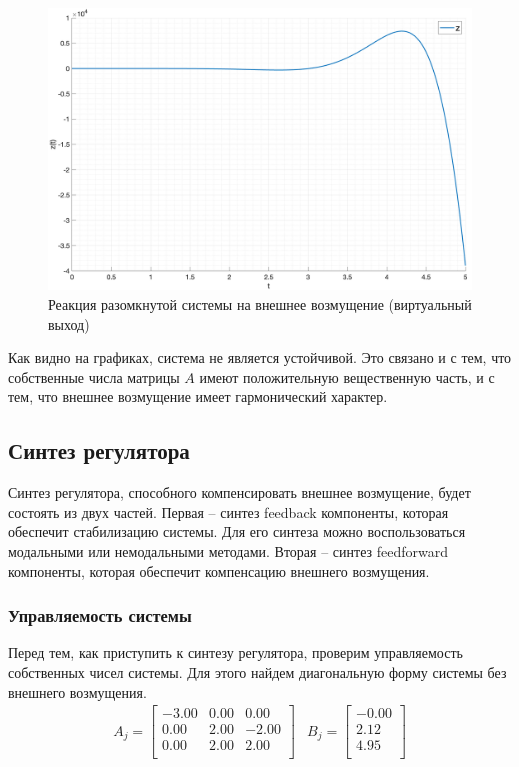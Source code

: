 \begin{figure}[ht!]
    \centering
    \includegraphics[width=\textwidth]{media/plots/open_z.png}
    \caption{Реакция разомкнутой системы на внешнее возмущение (виртуальный выход)}
    \label{fig:open_z}
\end{figure}
Как видно на графиках, система не является устойчивой. Это связано и с тем, что
собственные числа матрицы $A$ имеют положительную вещественную часть, и с тем, что
внешнее возмущение имеет гармонический характер.

\FloatBarrier
\subsection{Синтез регулятора}
Синтез регулятора, способного компенсировать внешнее возмущение, будет состоять из двух частей. 
Первая -- синтез feedback компоненты, которая обеспечит стабилизацию системы. Для его синтеза
можно воспользоваться модальными или немодальными методами. Вторая -- синтез feedforward компоненты,
которая обеспечит компенсацию внешнего возмущения.

\subsubsection{Управляемость системы}
Перед тем, как приступить к синтезу регулятора, проверим управляемость собственных 
чисел системы. Для этого найдем диагональную форму системы без внешнего возмущения.
\begin{eqnarray}
    A_j = \begin{bmatrix}
        -3.00  & 0.00  & 0.00 \\ 
        0.00  & 2.00  & -2.00 \\ 
        0.00  & 2.00  & 2.00 \\ 
    \end{bmatrix} &
    B_j = \begin{bmatrix}
    -0.00 \\ 
    2.12 \\ 
    4.95 \\ 
    \end{bmatrix}
\end{eqnarray}


